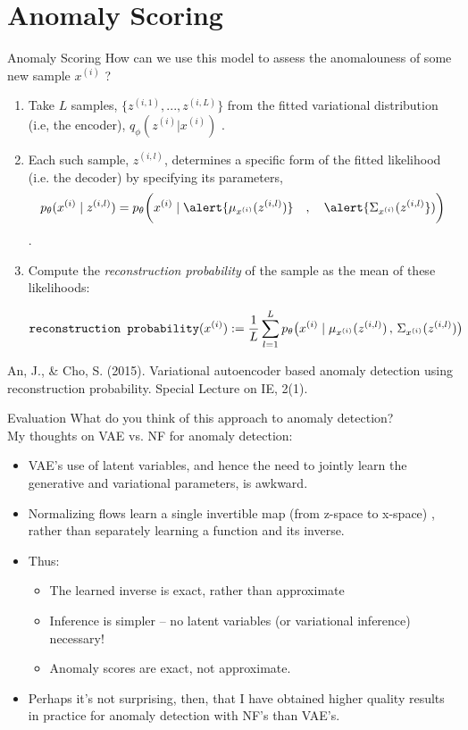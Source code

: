 \documentclass[10pt]{beamer}
\newcommand{\obs}{x^{(i)} }
\newcommand{\alatent}{z^{(i)} }
\begin{document}
\section{Anomaly Scoring}

\begin{frame}{Anomaly Scoring}
\footnotesize How can we use this model to assess the anomalouness of some new sample $x^{(i)}$ ? \pause
\vfill 

\begin{enumerate}
\item Take $L$ samples, $\{z^{(i,1)}, ..., z^{(i,L)} \}$ from the fitted variational distribution (i.e, the encoder), $q_\phi(\alatent| x^{(i)})$ . \pause
\item   Each such sample, $z^{(i,l)}$, determines a specific form of the fitted likelihood (i.e. the decoder) by specifying its \alert{parameters},  \
\[ p_\theta(\obs \cond z^{(i,l)}) = p_\theta \bp{\obs \cond \alert{\mu_{\obs} (z^{(i,l)})} \quad , \quad \alert{\Sigma_{\obs} (z^{(i,l)}})} \].  \pause 
\item Compute the \textit{reconstruction probability} of the sample as the mean of these likelihoods:

\[ \texttt{reconstruction probability}(x^{(i)}) := \df{1}{L} \ds\sum_{l=1}^L p_\theta \big(\obs \cond \mu_{\obs} (z^{(i,l)}) \, , \, \Sigma_{\obs} (z^{(i,l)}) \big)\]
\end{enumerate}

\vfill \vfill
\hfill \tiny An, J., \& Cho, S. (2015). Variational autoencoder based anomaly detection using reconstruction probability. Special Lecture on IE, 2(1).
\end{frame}

\begin{frame}{Evaluation}
What do you think of this approach to anomaly detection? \\
\vfil 
My thoughts on VAE vs. NF for anomaly detection:
\begin{itemize}
\item  VAE's use of latent variables, and hence the need to jointly learn the generative and variational parameters, is awkward. \pause 
\item Normalizing flows learn a single invertible map \tiny (from z-space to x-space) \normalsize, rather than separately learning a function and its inverse.  \pause 
\item Thus:

	\begin{itemize}
	\item  The learned inverse is exact, rather than approximate 
	\item Inference is simpler -- no latent variables (or variational inference) necessary!  
    \item Anomaly scores are exact, not approximate. \pause 
	\end{itemize}
\item Perhaps it's not surprising, then, that I have obtained higher quality results in practice for anomaly detection with NF's than VAE's.
\end{itemize}

\end{frame}
\end{document}
